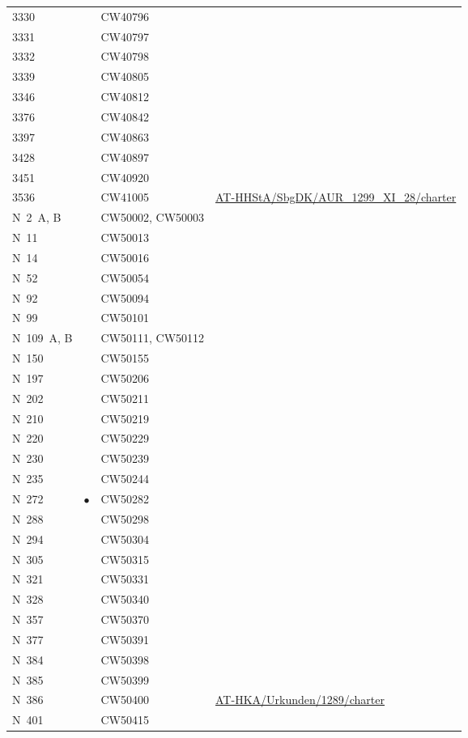 \begin{xltabular}{\linewidth}{@{} l c l X @{}}
3330	&           & CW40796 \\
3331	&           & CW40797 \\
3332	&           & CW40798 \\
3339	&           & CW40805 \\
3346	&           & CW40812 \\
3376	&           & CW40842 \\
3397	&           & CW40863 \\
3428	&           & CW40897 \\
3451	&           & CW40920 \\
3536	&           & CW41005
		& \url{AT-HHStA/SbgDK/AUR_1299_XI_28/charter}
	\\
N~2~A, B	&           & CW50002, CW50003 \\
N~11	&           & CW50013 \\
N~14	&           & CW50016 \\
N~52	&           & CW50054 \\
N~92	&           & CW50094 \\
N~99	&           & CW50101 \\
N~109~A, B	&           & CW50111, CW50112 \\
N~150	&           & CW50155 \\
N~197	&           & CW50206 \\
N~202	&           & CW50211 \\
N~210	&           & CW50219 \\
N~220	&           & CW50229 \\
N~230	&           & CW50239 \\
N~235	&           & CW50244 \\
N~272	& $\bullet$ & CW50282 \\
N~288	&           & CW50298 \\
N~294	&           & CW50304 \\
N~305	&           & CW50315 \\
N~321	&           & CW50331 \\
N~328	&           & CW50340 \\
N~357	&           & CW50370 \\
N~377	&           & CW50391 \\
N~384	&           & CW50398 \\
N~385	&           & CW50399 \\
N~386	&           & CW50400
		& \url{AT-HKA/Urkunden/1289/charter}
	\\
N~401	&           & CW50415 \\

\end{xltabular}
